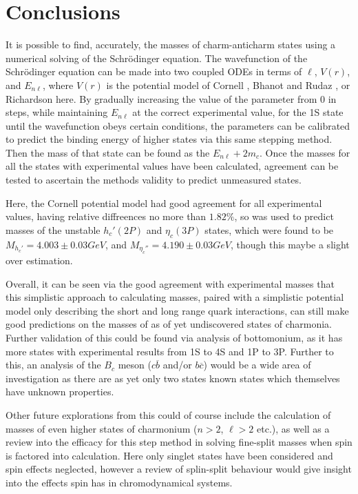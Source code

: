 \documentclass[10pt,twocolumn]{revtex4}    %
\begin{document}
\section{Conclusions}
 
 It is possible to find, accurately, the masses of charm-anticharm states using a numerical solving of the Schr\"odinger equation.
The wavefunction of the Schr\"odinger equation can be made into two coupled ODEs in terms of $\ell$, $V(r)$, and $E_{n\ell}$, where $V(r)$ is the potential model of Cornell \cite{CornellPaper}, Bhanot and Rudaz \cite{BhRoPaper}, or Richardson \cite{RichardsonPaper} here. 
By gradually increasing the value of the parameter from $0$ in steps, while maintaining $E_{n\ell}$ at the correct experimental value, for the 1S state until the wavefunction obeys certain conditions, the parameters can be calibrated to predict the binding energy of higher states via this same stepping method. Then the mass of that state can be found as the $E_{n\ell} + 2m_c$. Once the masses for all the states with experimental values have been calculated, agreement can be tested to ascertain the methods validity to predict unmeasured states.

Here, the Cornell potential model had good agreement for all experimental values, having relative diffreences no more than $1.82\%$, so was used to predict masses of the unstable $h_c'(2P)$ and $\eta_c(3P)$ states, which were found to be $M_{h_c'} = 4.003 \pm 0.03 GeV$, and $M_{\eta_c''} = 4.190 \pm  0.03 GeV$, though this maybe a slight over estimation.

Overall, it can be seen via the good agreement with experimental masses that this simplistic approach to calculating masses, paired with a simplistic potential model only describing the short and long range quark interactions, can still make good predictions on the masses of as of yet undiscovered states of charmonia. Further validation of this could be found via analysis of bottomonium, as it has more states with experimental results from 1S to 4S and 1P to 3P\textbf{\cite{pdg}}. Further to this, an analysis of the $B_c$ meson ($c\overline{b}$ and/or $b\overline{c}$) would be a wide area of investigation as there are as yet only two states known states which themselves have unknown properties. 

Other future explorations from this could of course include the calculation of masses of even higher states of charmonium ($n>2$, $\ell > 2$ etc.), as well as a review into the efficacy for this step method in solving fine-split masses when spin is factored into calculation. Here only singlet states have been considered and spin effects neglected, however a review of splin-split behaviour would give insight into the effects spin has in chromodynamical systems.
\end{document}
